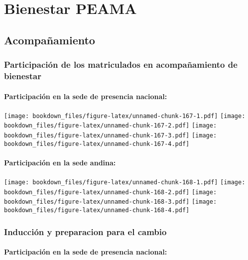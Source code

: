 \documentclass[]{article}
\let\oldparagraph\paragraph
\renewcommand{\paragraph}[1]{\oldparagraph{#1}\mbox{}}
\theoremstyle{definition}
\theoremstyle{definition}
\theoremstyle{definition}
\theoremstyle{remark}
\begin{document}
\section{Bienestar PEAMA}\label{bienestar-peama}

\subsection{Acompañamiento}\label{acompanamiento-1}

\subsubsection{Participación de los matriculados en acompañamiento de
bienestar}\label{participacion-de-los-matriculados-en-acompanamiento-de-bienestar}

\paragraph{Participación en la sede de presencia
nacional:}\label{participacion-en-la-sede-de-presencia-nacional}

\texttt{[image: bookdown\_files/figure-latex/unnamed-chunk-167-1.pdf]}
\texttt{[image: bookdown\_files/figure-latex/unnamed-chunk-167-2.pdf]}
\texttt{[image: bookdown\_files/figure-latex/unnamed-chunk-167-3.pdf]}
\texttt{[image: bookdown\_files/figure-latex/unnamed-chunk-167-4.pdf]}

\paragraph{Participación en la sede
andina:}\label{participacion-en-la-sede-andina}

\texttt{[image: bookdown\_files/figure-latex/unnamed-chunk-168-1.pdf]}
\texttt{[image: bookdown\_files/figure-latex/unnamed-chunk-168-2.pdf]}
\texttt{[image: bookdown\_files/figure-latex/unnamed-chunk-168-3.pdf]}
\texttt{[image: bookdown\_files/figure-latex/unnamed-chunk-168-4.pdf]}

\subsubsection{Inducción y preparacion para el
cambio}\label{induccion-y-preparacion-para-el-cambio}

\paragraph{Participación en la sede de presencia
nacional:}\label{participacion-en-la-sede-de-presencia-nacional-1}
\end{document}
